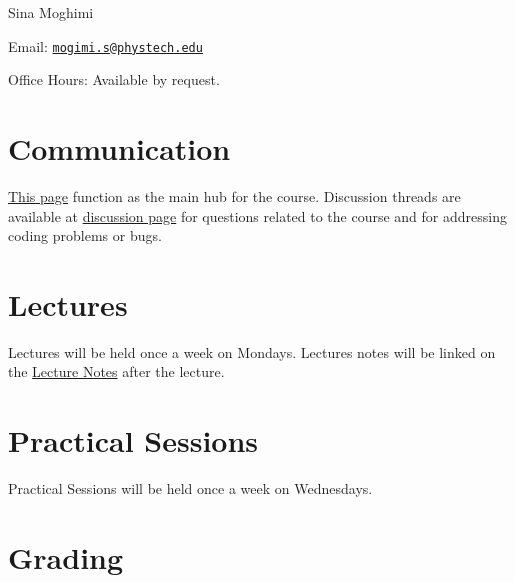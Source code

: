 \documentclass[
]{book}
\begin{document}
Sina Moghimi

Email: \href{mailto:mogimi.s@phystech.edu}{\nolinkurl{mogimi.s@phystech.edu}}

Office Hours: Available by request.

\hypertarget{communication}{%
\section{Communication}\label{communication}}

\href{https://neuralincendio.github.io}{This page} function as the main hub for the course. Discussion threads are available at \href{https://github.com/NeuralIncendio/neuralIncendio.github.io/discussions/}{discussion page} for questions related to the course and for addressing coding problems or bugs.

\hypertarget{lectures}{%
\section{Lectures}\label{lectures}}

Lectures will be held once a week on Mondays. Lectures notes will be linked on the \protect\hyperlink{Lecture_Notes}{Lecture Notes} after the lecture.

\hypertarget{practical-sessions}{%
\section{Practical Sessions}\label{practical-sessions}}

Practical Sessions will be held once a week on Wednesdays.

\hypertarget{grading}{%
\section{Grading}\label{grading}}
\end{document}
